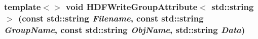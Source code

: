 \subsubsection[{HDFWriteGroupAttribute$<$ std::string $>$}]{\setlength{\rightskip}{0pt plus 5cm}template$<$$>$ void HDFWriteGroupAttribute$<$ std::string $>$ (const std::string {\em Filename}, \/  const std::string {\em GroupName}, \/  const std::string {\em ObjName}, \/  std::string {\em Data})}\label{HDFIO__new_8h_a1e82999f4bd8497304ff6571d9566781}
